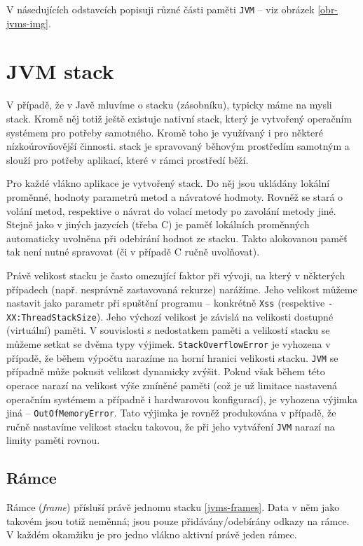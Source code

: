 V násedujících odstavcích popisuji různé části paměti \texttt{JVM} -- viz obrázek \ref{obr-jvms-img}.

\section{JVM stack}
V případě, že v Javě mluvíme o stacku (zásobníku), typicky máme na mysli  stack. Kromě něj totiž ještě existuje nativní stack, který je vytvořený operačním systémem pro potřeby  samotného. Kromě toho je využívaný i pro některé nízkoúrovňovější činnosti.  stack je spravovaný běhovým prostředím samotným a slouží pro potřeby aplikací, které v rámci prostředí běží.

Pro každé vlákno aplikace je vytvořený stack. Do něj jsou ukládány lokální proměnné, hodnoty parametrů metod a návratové hodmoty. Rovněž se stará o volání metod, respektive o návrat do volací metody po zavolání metody jiné. Stejně jako v jiných jazycích (třeba C) je paměť lokálních proměnných automaticky uvolněna při odebírání hodnot ze stacku. Takto alokovanou paměť tak není nutné spravovat  (či v případě C ručně uvolňovat).

Právě velikost  stacku je často omezující faktor při vývoji, na který v některých případech (např. nesprávně zastavovaná rekurze) narážíme. Jeho velikost můžeme nastavit jako parametr při spuštění programu -- konkrétně \texttt{Xss} (respektive \texttt{-XX:ThreadStackSize}). Jeho výchozí velikost je závislá na velikosti dostupné (virtuální) paměti. V souvislosti s nedostatkem paměti a velikostí stacku se můžeme setkat se dvěma typy výjimek. \texttt{Stack\-Overflow\-Error} je vyhozena v případě, že během výpočtu narazíme na horní hranici velikosti stacku. \texttt{JVM} se případně může pokusit velikost dynamicky zvýšit. Pokud však během této operace narazí na velikost výše zmíněné paměti (což je už limitace nastavená operačním systémem a případně i hardwarovou konfigurací), je vyhozena výjimka jiná -- \texttt{OutOfMemoryError}. Tato výjimka je rovněž produkována v případě, že ručně nastavíme velikost stacku takovou, že při jeho vytváření \texttt{JVM} narazí na limity paměti rovnou.

\subsection{Rámce}
Rámce (\textit{frame}) přísluší právě jednomu stacku \ref{jvms-frames}. Data v něm jako takovém jsou totiž neměnná; jsou pouze přidávány/odebírány odkazy na rámce. V každém okamžiku je pro jedno vlákno aktivní právě jeden rámec. 

